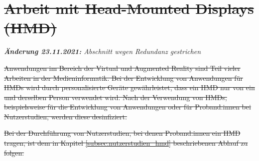 \section{\sout{Arbeit mit Head-Mounted Displays (HMD)}}\label{sec:hmd}

\noindent
\emph{\textbf{Änderung 23.11.2021:} Abschnitt wegen Redundanz gestrichen}
\medskip

\medskip
\noindent
\sout{Anwendungen im Bereich der Virtual und Augmented Reality sind Teil vieler Arbeiten in der Medieninformatik.
Bei der Entwicklung von Anwendungen für HMDs wird durch personalisierte Geräte gewährleistet, dass ein HMD nur von ein und derselben Person verwendet wird.
Nach der Verwendung von HMDs, beispielsweise für die Entwicklung von Anwendungen oder für Proband:innen bei Nutzerstudien, werden diese desinfiziert.}

\medskip
\noindent
\sout{Bei der Durchführung von Nutzerstudien, bei denen Proband:innen ein HMD tragen, ist dem in Kapitel \ref{subsec:nutzerstudien_hmd} beschriebenen Ablauf zu folgen.}
